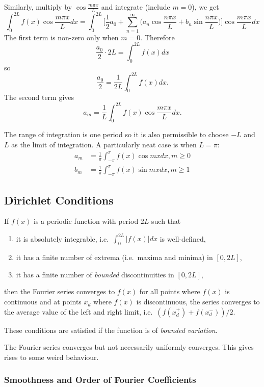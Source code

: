 \documentclass[a4paper]{article}
\begin{document}
Similarly, multiply by $\cos \frac{m\pi x}{L}$ and integrate (include $m=0$), we get
\[
  \int_0^{2L} f(x)\cos\frac{m\pi x}{L} dx = \int_0^{2L} \Bigg[ \frac{1}{2}a_0 + \sum_{n=1}^\infty \Big(a_n\cos\frac{n\pi x}{L} +b_n\sin\frac{n\pi x}{L}\Big) \Bigg] \cos\frac{m\pi x}{L} dx
\]
The first term is non-zero only when $m=0$. Therefore
\[
  \frac{a_0}{2} \cdot 2L = \int_0^{2L} f(x) dx
\]
so
\[
\frac{a_0}{2} = \frac{1}{2L}\int_0^{2L} f(x) dx.
\]
The second term gives
\[
  a_m = \frac{1}{L} \int_0^{2L} f(x) \cos\frac{m\pi x}{L} dx.
\]

The range of integration is one period so it is also permissible to choose $-L$ and $L$ as the limit of integration. A particularly neat case is when $L=\pi$:
\begin{align*}
  a_m &= \frac{1}{\pi} \int_{-\pi}^\pi f(x) \cos mx dx, m\geq0 \\
  b_m &= \frac{1}{\pi} \int_{-\pi}^\pi f(x) \sin mx dx, m\geq1
\end{align*}

\subsection{Dirichlet Conditions}

If $f(x)$ is a periodic function with period $2L$ such that
\begin{enumerate}
\item it is absolutely integrable, i.e.\ $\int_0^{2L}|f(x)| dx$ is well-defined,
\item it has a finite number of extrema (i.e.\ maxima and minima) in $[0,2L]$,
  \item it has a finite number of \emph{bounded} discontinuities in $[0,2L]$,
\end{enumerate}
then the Fourier series converges to $f(x)$ for all points where $f(x)$ is continuous and at points $x_d$ where $f(x)$ is discontinuous, the series converges to the average value of the left and right limit, i.e.\ $(f(x_d^+)+f(x_d^-))/2$.

These conditions are satisfied if the function is of \emph{bounded variation}.

\begin{remark}
  The Fourier series converges but not necessarily uniformly converges. This gives rises to some weird behaviour.
\end{remark}

\subsubsection{Smoothness and Order of Fourier Coefficients}
\end{document}
